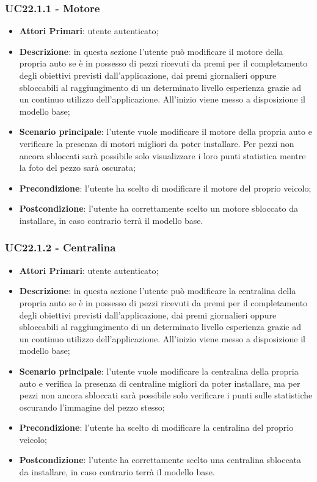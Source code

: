\subsubsection{UC22.1.1 - Motore}
\begin{itemize}
	\item \textbf{Attori Primari}: utente autenticato;
	\item \textbf{Descrizione}: in questa sezione l'utente può modificare il motore della propria auto se è in possesso di pezzi ricevuti da premi per il completamento degli obiettivi previsti dall'applicazione, dai premi giornalieri oppure sbloccabili al raggiungimento di un determinato livello esperienza grazie ad un continuo utilizzo dell'applicazione.
	All'inizio viene messo a disposizione il modello base;
	\item \textbf{Scenario principale}: l'utente vuole modificare il motore della propria auto e verificare la presenza di motori migliori da poter installare. Per pezzi non ancora sbloccati sarà possibile solo visualizzare i loro punti statistica mentre la foto del pezzo sarà oscurata;
	\item \textbf{Precondizione}: l'utente ha scelto di modificare il motore del proprio veicolo; 
	\item \textbf{Postcondizione}: l'utente ha correttamente scelto un motore sbloccato da installare, in caso contrario terrà il modello base.
\end{itemize}
\subsubsection{UC22.1.2 - Centralina}
\begin{itemize}
	\item \textbf{Attori Primari}: utente autenticato;
	\item \textbf{Descrizione}: in questa sezione l'utente può modificare la centralina della propria auto se è in possesso di pezzi ricevuti da premi per il completamento degli obiettivi previsti dall'applicazione, dai premi giornalieri oppure sbloccabili al raggiungimento di un determinato livello esperienza grazie ad un continuo utilizzo dell'applicazione.
	All'inizio viene messo a disposizione il modello base;
	\item \textbf{Scenario principale}: l'utente vuole modificare la centralina della propria auto e verifica la presenza di centraline migliori da poter installare, ma per pezzi non ancora sbloccati sarà possibile solo verificare i punti sulle statistiche oscurando l'immagine del pezzo stesso;
	\item \textbf{Precondizione}: l'utente ha scelto di modificare la centralina del proprio veicolo; 
	\item \textbf{Postcondizione}: l'utente ha correttamente scelto una centralina sbloccata da installare, in caso contrario terrà il modello base.
\end{itemize}
